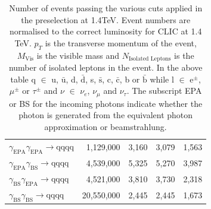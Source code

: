 \begin{table}[h!]
\begin{tabular}{ l r r r r }
$\gamma_{\text{EPA}}\gamma_{\text{EPA}} \rightarrow \text{qqqq}$ & 1,129,000 & 3,160 & 3,079 & 1,563\\
$\gamma_{\text{EPA}}\gamma_{\text{BS}} \rightarrow \text{qqqq}$ & 4,539,000 & 5,325 & 5,270 & 3,987\\
$\gamma_{\text{BS}}\gamma_{\text{EPA}} \rightarrow \text{qqqq}$ & 4,521,000 & 3,810 & 3,730 & 2,318\\
$\gamma_{\text{BS}}\gamma_{\text{BS}} \rightarrow \text{qqqq}$ & 20,550,000 & 2,445 & 2,445 & 1,673\\
\hline
\end{tabular}
\caption[Number of events passing the various cuts applied in the preselection at 1.4TeV.]{Number of events passing the various cuts applied in the preselection at 1.4TeV.  Event numbers are normalised to the correct luminosity for CLIC at 1.4 TeV.  $p_{T}$ is the transverse momentum of the event,  $M_{\text{Vis}}$ is the visible mass and $N_{\text{Isolated Leptons}}$ is the number of isolated leptons in the event.  In the above table q $\in$ u, $\bar{\text{u}}$, d, $\bar{\text{d}}$, s, $\bar{\text{s}}$, c, $\bar{\text{c}}$, b or $\bar{\text{b}}$ while l $\in$ $\text{e}^{\pm}$, $\mu^{\pm}$ or $\tau^{\pm}$ and $\nu$ $\in$ $\nu_{e}$, $\nu_{\mu}$ and $\nu_{\tau}$.  The subscript EPA or BS for the incoming photons indicate whether the photon is generated from the equivalent photon approximation or beamstrahlung.}
\label{table:preselectionnumbers1400GeV}
\end{table}

